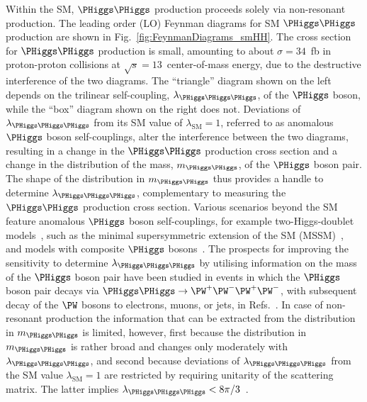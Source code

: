 Within the SM, $\PHiggs\PHiggs$ production proceeds solely via non-resonant production.
The leading order (LO) Feynman diagrams for SM $\PHiggs\PHiggs$ production are shown in Fig.~\ref{fig:FeynmanDiagrams_smHH}.
The cross section for $\PHiggs\PHiggs$ production is small, amounting to about $\sigma = 34$~fb in proton-proton collisions at $\sqrt{s}=13$~\TeV center-of-mass energy,
due to the destructive interference of the two diagrams.
The ``triangle'' diagram shown on the left depends on the trilinear self-coupling, $\lambda_{\PHiggs\PHiggs\PHiggs}$, of the $\PHiggs$ boson, 
while the ``box'' diagram shown on the right does not.
Deviations of $\lambda_{\PHiggs\PHiggs\PHiggs}$ from its SM value of $\lambda_{\textrm{SM}}=1$, referred to as anomalous $\PHiggs$ boson self-couplings,
alter the interference between the two diagrams, 
resulting in a change in the $\PHiggs\PHiggs$ production cross section and a change in the distribution of the mass, $m_{\PHiggs\PHiggs}$, of the $\PHiggs$ boson pair.
The shape of the distribution in $m_{\PHiggs\PHiggs}$ thus provides a handle to determine $\lambda_{\PHiggs\PHiggs\PHiggs}$,
complementary to measuring the $\PHiggs\PHiggs$ production cross section.
Various scenarios beyond the SM feature anomalous $\PHiggs$ boson self-couplings,
for example two-Higgs-doublet models~\cite{Branco:2011iw}, such as the minimal supersymmetric extension of the SM (MSSM)~\cite{Gunion:1989we},
and models with composite $\PHiggs$ bosons~\cite{Grober:2010yv,Contino:2012xk}.
The prospects for improving the sensitivity to determine $\lambda_{\PHiggs\PHiggs\PHiggs}$ by utilising information on the mass of the $\PHiggs$ boson pair
have been studied in events in which the $\PHiggs$ boson pair decays via $\PHiggs\PHiggs \to \PW^{+}\PW^{-}\PW^{+}\PW^{-}$, with subsequent decay of the $\PW$ bosons to electrons, muons, or jets,
in Refs.~\cite{Baur:2002rb,Baur:2002qd}.
In case of non-resonant production the information that can be extracted from the distribution in $m_{\PHiggs\PHiggs}$ is limited, however,
first because the distribution in $m_{\PHiggs\PHiggs}$ is rather broad and changes only moderately with $\lambda_{\PHiggs\PHiggs\PHiggs}$,
and second because deviations of $\lambda_{\PHiggs\PHiggs\PHiggs}$ from the SM value $\lambda_{\textrm{SM}}=1$ are restricted by requiring unitarity of the scattering matrix.
The latter implies $\lambda_{\PHiggs\PHiggs\PHiggs} < 8\pi/3$~\cite{Lee:1977yc}.

